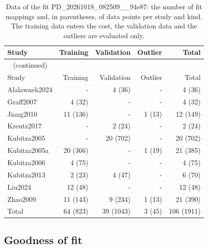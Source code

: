 \begin{longtable}{lrrrr}
\caption{Data of the fit PD\_20261018\_082509\_\_94e87: the number of fit mappings and, in parentheses, of data points per study and kind. The training data enters the cost, the validation data and the outliers are evaluated only.}\label{tab:data:PD_20261018_082509__94e87} \\
\toprule
Study & Training & Validation & Outlier & Total \\
\midrule
\endfirsthead
\multicolumn{5}{l}{\small\tablename~\thetable{} (continued)} \\
\toprule
Study & Training & Validation & Outlier & Total \\
\midrule
\endhead
\bottomrule
\endlastfoot
Alalawneh2024 & - & 4 (36) & - & 4 (36) \\
Graff2007 & 4 (32) & - & - & 4 (32) \\
Jiang2010 & 11 (136) & - & 1 (13) & 12 (149) \\
Kreutz2017 & - & 2 (24) & - & 2 (24) \\
Kubitza2005 & - & 20 (702) & - & 20 (702) \\
Kubitza2005a & 20 (366) & - & 1 (19) & 21 (385) \\
Kubitza2006 & 4 (75) & - & - & 4 (75) \\
Kubitza2013 & 2 (23) & 4 (47) & - & 6 (70) \\
Liu2024 & 12 (48) & - & - & 12 (48) \\
Zhao2009 & 11 (143) & 9 (234) & 1 (13) & 21 (390) \\
Total & 64 (823) & 39 (1043) & 3 (45) & 106 (1911) \\
\end{longtable}

\subsection{Goodness of fit}

